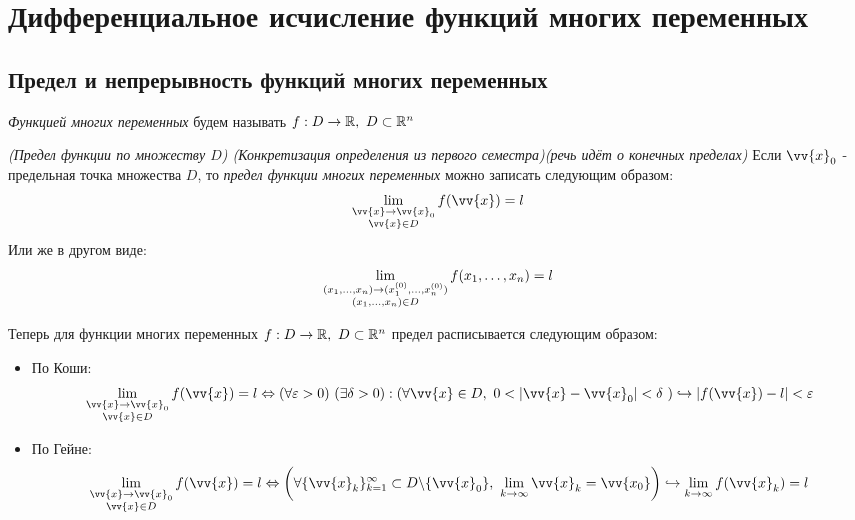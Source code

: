 
\section{Дифференциальное исчисление функций многих переменных}

\subsection{Предел и непрерывность функций многих переменных}

\begin{definition}
	\textit{Функцией многих переменных} будем называть $f: D \to \mathbb{R},\ D \subset \mathbb{R}^n$
\end{definition}

\begin{definition}
	\textit{(Предел функции по множеству $D$) (Конкретизация определения из первого семестра)(речь идёт о конечных пределах)} Если $\vv{x}_0$ - предельная точка множества $D$, то \textit{предел функции многих переменных} можно записать следующим образом:
	\[
		\liml_{\substack{\vv{x} \to \vv{x}_0 \\ \vv{x} \in D}} f(\vv{x}) = l
	\]
	Или же в другом виде:
	\[
		\lim\limits_{\substack{(x_1, \ldots, x_n) \to (x_1^{(0)}, \ldots, x_n^{(0)}) \\ (x_1, \ldots, x_n) \in D}} f(x_1, \ldots, x_n) = l
	\]
	
	Теперь для функции многих переменных $f: D \to \mathbb{R},\ D \subset \mathbb{R}^n$ предел расписывается следующим образом:
	\begin{itemize}
		\item По Коши:
		\[
			\liml_{\substack{\vv{x} \to \vv{x}_0 \\ \vv{x} \in D}} f(\vv{x}) = l \lra (\forall \eps > 0)\ (\exists \delta > 0) : (\forall \vv{x} \in D,\ 0 < |\vv{x} - \vv{x}_0| < \delta\ )\hookrightarrow |f(\vv{x}) - l| < \eps
		\]
		
		\item По Гейне:
		\[
			\liml_{\substack{\vv{x} \to \vv{x}_0 \\ \vv{x} \in D}} f(\vv{x}) = l \lra \left(\forall \{\vv{x}_k\}_{k = 1}^\infty \subset D \bs \{\vv{x}_0\},\ \liml_{k \to \infty} \vv{x}_k = \vv{x_0}\right) \hookrightarrow \liml_{k \to \infty} f(\vv{x}_k) = l
		\]
	\end{itemize}
\end{definition}

